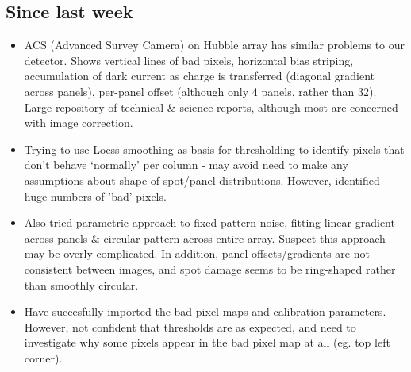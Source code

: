 \documentclass[10pt,fleqn]{article}
\begin{document}
\subsection*{Since last week}

\begin{itemize}

\item ACS (Advanced Survey Camera) on Hubble array has similar problems to our detector. Shows vertical lines of bad pixels, horizontal bias striping, accumulation of dark current as charge is transferred (diagonal gradient across panels), per-panel offset (although only 4 panels, rather than 32). Large repository of technical \& science reports, although most are concerned with image correction.

\item Trying to use Loess smoothing as basis for thresholding to identify pixels that don't behave `normally' per column - may avoid need to make any assumptions about shape of spot/panel distributions. However, identified huge numbers of 'bad' pixels.

\item Also tried parametric approach to fixed-pattern noise, fitting linear gradient across panels \& circular pattern across entire array. Suspect this approach may be overly complicated. In addition, panel offsets/gradients are not consistent between images, and spot damage seems to be ring-shaped rather than smoothly circular.

\item Have succesfully imported the bad pixel maps and calibration parameters. However, not confident that thresholds are as expected, and need to investigate why some pixels appear in the bad pixel map at all (eg. top left corner).


\end{itemize}
\end{document}

